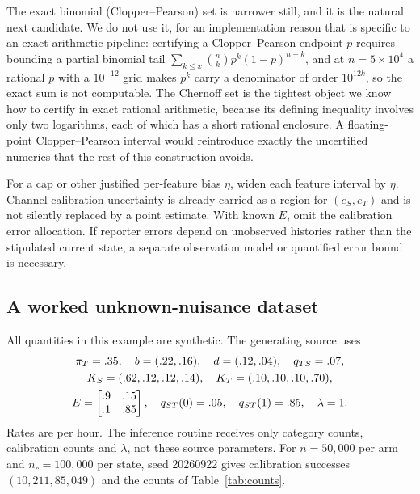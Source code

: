 \documentclass[11pt]{article}
\theoremstyle{definition}
\begin{document}
The exact binomial (Clopper--Pearson) set is narrower still, and it is the
natural next candidate. We do not use it, for an implementation reason that is
specific to an exact-arithmetic pipeline: certifying a Clopper--Pearson endpoint
$p$ requires bounding a partial binomial tail $\sum_{k\le x}\binom nk
p^k(1-p)^{n-k}$, and at $n=5\times10^4$ a rational $p$ with a $10^{-12}$ grid
makes $p^k$ carry a denominator of order $10^{12k}$, so the exact sum is not
computable. The Chernoff set is the tightest object we know how to certify in
exact rational arithmetic, because its defining inequality involves only two
logarithms, each of which has a short rational enclosure. A floating-point
Clopper--Pearson interval would reintroduce exactly the uncertified numerics
that the rest of this construction avoids.

For a cap or other justified per-feature bias $\eta$, widen each feature
interval by $\eta$. Channel calibration uncertainty is already carried as a
region for $(e_S,e_T)$ and is not silently replaced by a point estimate. With
known $E$, omit the calibration error allocation. If reporter errors depend on
unobserved histories rather than the stipulated current state, a separate
observation model or quantified error bound is necessary.

\subsection{A worked unknown-nuisance dataset}\label{sec:worked}
All quantities in this example are synthetic. The generating source uses
\begin{gather}
 \pi_T=.35,\quad b=(.22,.16),\quad d=(.12,.04),\quad q_{TS}=.07,\notag\\
 K_S=(.62,.12,.12,.14),\quad K_T=(.10,.10,.10,.70),\notag\\
 E=\begin{bmatrix}.9&.15\\.1&.85\end{bmatrix},\quad
 q_{ST}(0)=.05,\quad q_{ST}(1)=.85,\quad\lambda=1.\label{eq:example}
\end{gather}
Rates are per hour. The inference routine receives only category counts,
calibration counts and $\lambda$, not these source parameters. For $n=50{,}000$
per arm and $n_c=100{,}000$ per state, seed 20260922 gives calibration successes
$(10{,}211,85{,}049)$ and the counts of Table~\ref{tab:counts}.
\end{document}
